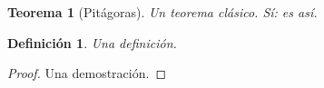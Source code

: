 \documentclass{article}
\newtheorem{teo}{Teorema}
\newtheorem{defi}{Definición}
\begin{document}
\begin{teo}[Pitágoras]
Un teorema clásico. Sí: es así.
\end{teo}
\begin{defi}
Una definición.
\end{defi}
\begin{proof}
Una demostración.
\end{proof}
\begin{table}[h]
\caption{Una tabla}
\end{table}
\end{document}
